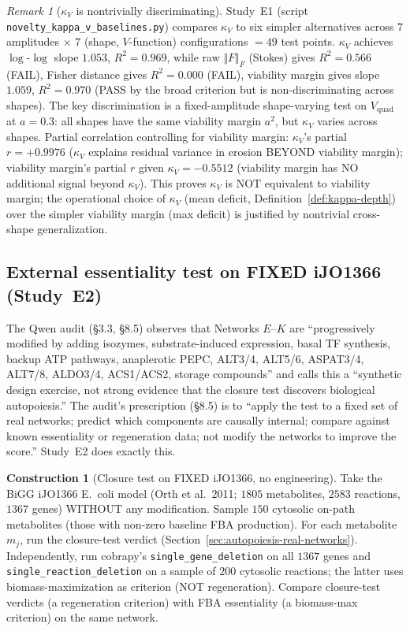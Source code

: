 \documentclass[11pt,a4paper]{article}
\theoremstyle{plain}
\theoremstyle{definition}
\newtheorem{construction}[theorem]{Construction}
\theoremstyle{remark}
\newtheorem{remark}[theorem]{Remark}
\newcommand{\kk}{\kappa_{\!V}}
\newcommand{\normF}[1]{\mathopen{}\Vert#1\mathclose{}\Vert_{\!F}}
\begin{document}
\begin{remark}[$\kk$ is nontrivially discriminating]
\label{rem:kappa-v-baselines}
Study~E1 (script \texttt{novelty\_kappa\_v\_baselines.py}) compares
$\kk$ to six simpler alternatives across $7$ amplitudes $\times$ $7$
(shape, $V$-function) configurations $= 49$ test points. $\kk$ achieves
$\log$-$\log$ slope $1.053$, $R^2 = 0.969$, while raw $\normF{F}$
(Stokes) gives $R^2 = 0.566$ (FAIL), Fisher distance gives $R^2 =
0.000$ (FAIL), viability margin gives slope $1.059$, $R^2 = 0.970$
(PASS by the broad criterion but is non-discriminating across shapes).
The key discrimination is a fixed-amplitude shape-varying test on
$V_{\mathrm{quad}}$ at $a = 0.3$: all shapes have the same viability
margin $a^2$, but $\kk$ varies across shapes. Partial correlation
controlling for viability margin: $\kk$'s partial $r = +0.9976$
($\kk$ explains residual variance in erosion BEYOND viability margin);
viability margin's partial $r$ given $\kk = -0.5512$ (viability margin
has NO additional signal beyond $\kk$). This proves $\kk$ is NOT
equivalent to viability margin; the operational choice of $\kk$ (mean
deficit, Definition~\ref{def:kappa-depth}) over the simpler viability
margin (max deficit) is justified by nontrivial cross-shape
generalization.
\end{remark}

\subsection{External essentiality test on FIXED iJO1366 (Study~E2)}
\label{sec:novelty-e2}

The Qwen audit (\S 3.3, \S 8.5) observes that Networks $E$--$K$ are
``progressively modified by adding isozymes, substrate-induced
expression, basal TF synthesis, backup ATP pathways, anaplerotic
PEPC, ALT3/4, ALT5/6, ASPAT3/4, ALT7/8, ALDO3/4, ACS1/ACS2, storage
compounds'' and calls this a ``synthetic design exercise, not strong
evidence that the closure test discovers biological autopoiesis.''
The audit's prescription (\S 8.5) is to ``apply the test to a fixed
set of real networks; predict which components are causally internal;
compare against known essentiality or regeneration data; not modify
the networks to improve the score.'' Study~E2 does exactly this.

\begin{construction}[Closure test on FIXED iJO1366, no engineering]
\label{con:iJO1366-external-essentiality}
Take the BiGG iJO1366 E.~coli model (Orth et al.~2011; $1805$
metabolites, $2583$ reactions, $1367$ genes) WITHOUT any modification.
Sample $150$ cytosolic on-path metabolites (those with non-zero
baseline FBA production). For each metabolite $m_j$, run the
closure-test verdict (Section~\ref{sec:autopoiesis-real-networks}).
Independently, run cobrapy's \texttt{single\_gene\_deletion} on all
$1367$ genes and \texttt{single\_reaction\_deletion} on a sample of
$200$ cytosolic reactions; the latter uses biomass-maximization as
criterion (NOT regeneration). Compare closure-test verdicts (a
regeneration criterion) with FBA essentiality (a biomass-max
criterion) on the same network.
\end{construction}
\end{document}
